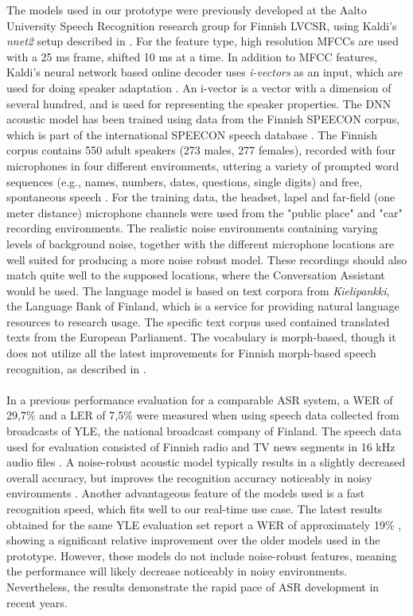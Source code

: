 \documentclass[english, 12pt, a4paper, pdftex, elec, utf8]{aaltothesis}
\begin{document}
The models used in our prototype were previously developed at the Aalto University Speech Recognition research group for Finnish LVCSR, using Kaldi's \textit{nnet2} setup described in \cite{povey2014parallel}. For the feature type, high resolution MFCCs are used with a 25 ms frame, shifted 10 ms at a time. In addition to MFCC features, Kaldi's neural network based online decoder uses \textit{i-vectors} as an input, which are used for doing speaker adaptation \cite{xiong2016achieving, kaldi}. An i-vector is a vector with a dimension of several hundred, and is used for representing the speaker properties. The DNN acoustic model has been trained using data from the Finnish SPEECON corpus, which is part of the international SPEECON speech database \cite{iskra2002speecon}. The Finnish corpus contains 550 adult speakers (273 males, 277 females), recorded with four microphones in four different environments, uttering a variety of prompted word sequences (e.g., names, numbers, dates, questions, single digits) and free, spontaneous speech \cite[p.~43]{kallasjoki2016}. For the training data, the headset, lapel and far-field (one meter distance) microphone channels were used from the "public place" and "car" recording environments. The realistic noise environments containing varying levels of background noise, together with the different microphone locations are well suited for producing a more noise robust model. These recordings should also match quite well to the supposed locations, where the Conversation Assistant would be used. The language model is based on text corpora from \textit{Kielipankki}, the Language Bank of Finland, which is a service for providing natural language resources to research usage. The specific text corpus used contained translated texts from the European Parliament. The vocabulary is morph-based, though it does not utilize all the latest improvements for Finnish morph-based speech recognition, as described in \cite{smit17boundaries, mansikka17parliament}. \\\\
In a previous performance evaluation for a comparable ASR system, a WER of 29,7\% and a LER of 7,5\% were measured when using speech data collected from broadcasts of YLE, the national broadcast company of Finland. The speech data used for evaluation consisted of Finnish radio and TV news segments in 16 kHz audio files \cite{mansikkaniemi2013unsupervised}. A noise-robust acoustic model typically results in a slightly decreased overall accuracy, but improves the recognition accuracy noticeably in noisy environments \cite{kallasjoki2016}. Another advantageous feature of the models used is a fast recognition speed, which fits well to our real-time use case. The latest results obtained for the same YLE evaluation set report a WER of approximately 19\% \cite{mansikka17parliament}, showing a significant relative improvement over the older models used in the prototype. However, these models do not include noise-robust features, meaning the performance will likely decrease noticeably in noisy environments. Nevertheless, the results demonstrate the rapid pace of ASR development in recent years.
\end{document}
